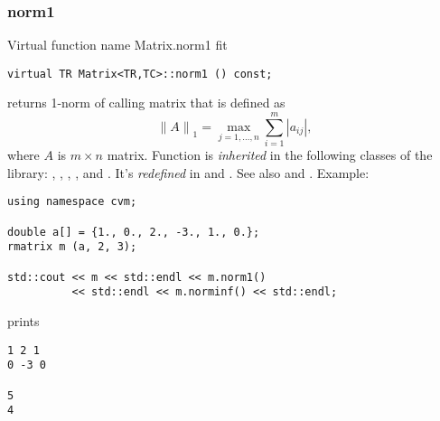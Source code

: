 \subsubsection{norm1}
Virtual function%
\pdfdest name {Matrix.norm1} fit
\begin{verbatim}
virtual TR Matrix<TR,TC>::norm1 () const;
\end{verbatim}
returns  1-norm of  calling matrix that is defined as
\begin{equation*}
{\|A\|}_{1}=\max_{j=1,\dots,n} \sum_{i=1}^{m} |a_{ij}|,
\end{equation*}
where $A$ is $m\times n$ matrix.
Function is \emph{inherited}
in the following classes of the library:
,   ,
, ,
 and .
It's \emph{redefined} in
 and .
See also  and
.
Example:
\begin{Verbatim}
using namespace cvm;

double a[] = {1., 0., 2., -3., 1., 0.};
rmatrix m (a, 2, 3);

std::cout << m << std::endl << m.norm1() 
          << std::endl << m.norminf() << std::endl;
\end{Verbatim}
prints
\begin{Verbatim}
1 2 1
0 -3 0

5
4
\end{Verbatim}
\newpage





